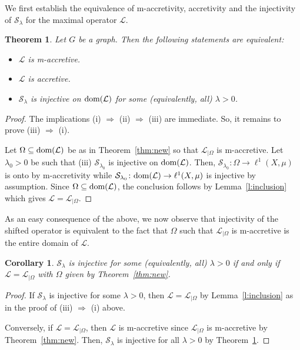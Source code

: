 \documentclass[letterpaper]{article}
\newtheorem{theorem}[lemma]{Theorem}
\newtheorem{corollary}[lemma]{Corollary}
\theoremstyle{definition}
\theoremstyle{named}
\numberwithin{equation}{section}
\newcommand{\lm}{\lambda}
\newcommand{\dom}{\textnormal{dom}} %
\newcommand{\Deltaphi}{\mathcal{L}}
\newcommand{\Deltaphiom}{\Deltaphi_{|\Omega}}
\begin{document}
We first establish the equivalence of m-accretivity, accretivity
and the injectivity of $\mathcal{S}_\lm$ for the maximal operator
$\Deltaphi$.

\begin{theorem}\label{t:fix} Let $G$ be a graph.
Then the following statements are equivalent:
    \begin{itemize}
        \item[\textup{(i)}] $\Deltaphi$ is m-accretive.
        \item[\textup{(ii)}] $\Deltaphi$ is accretive.
        \item[\textup{(iii)}] $\mathcal{S}_\lambda$ is injective on $\dom(\Deltaphi)$
        for some (equivalently, all) $\lambda >0$.
    \end{itemize}
\end{theorem}
\begin{proof}
The implications (i) $\Longrightarrow$ (ii) $\Longrightarrow$ (iii) are immediate. So, it remains to prove (iii) $\Longrightarrow$ (i). 

Let $\Omega \subseteq \dom(\Deltaphi)$ 
be as in Theorem~\ref{thm:new} so that $\Deltaphiom$ is m-accretive.
Let $\lambda_0 >0$ be such that (iii) $\mathcal{S}_{\lambda_0}$ is injective on $\dom(\Deltaphi)$.
Then, $\mathcal{S}_{\lm_0}\colon \Omega \to \ell^1(X,\mu)$
is onto by m-accretivity while $\mathcal{S}_{\lm_0}\colon \dom(\Deltaphi) \to \ell^1(X,\mu)$ is injective
by assumption.
Since $\Omega \subseteq \dom(\Deltaphi)$, the conclusion follows by Lemma~\ref{l:inclusion}
which gives $\Deltaphi=\Deltaphiom$.
\end{proof}


As an easy consequence of the above, we now observe that injectivity
of the shifted operator is equivalent to the fact that $\Omega$ such
that $\Deltaphiom$ is m-accretive is the entire domain of $\Deltaphi$.

\begin{corollary}
    $\mathcal{S}_\lambda$ is injective for some (equivalently, all) $\lambda>0$ if and only
    if $\Deltaphi = \Deltaphiom$ with $\Omega$ given by Theorem~\ref{thm:new}.
\end{corollary}
\begin{proof}
    If $\mathcal{S}_\lm$ is injective for some $\lm>0$, then $\Deltaphi = \Deltaphiom$
    by Lemma~\ref{l:inclusion} as in the proof of (iii) $\Longrightarrow$ (i)
    above.

    Conversely, if $\Deltaphi = \Deltaphiom$, then $\Deltaphi$ is m-accretive
    since $\Deltaphiom$ is m-accretive by Theorem~\ref{thm:new}. Then, $\mathcal{S}_\lm$
    is injective for all $\lm>0$ by Theorem~\ref{t:fix}.
\end{proof}
\end{document}
